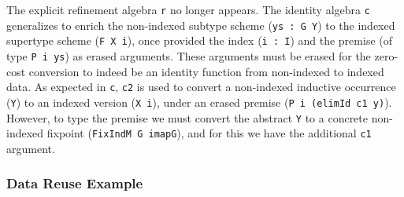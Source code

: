 \documentclass[acmsmall]{acmart}\settopmatter{}
\begin{document}
The explicit refinement algebra \verb;r; no longer appears. The
identity algebra \verb;c; generalizes to enrich the non-indexed
subtype scheme (\verb;ys : G Y;) to the indexed supertype scheme
(\verb;F X i;), once provided the index (\verb;i : I;) and the premise
(of type \verb;P i ys;) as erased arguments. These arguments must be
erased for the zero-cost conversion to indeed be an identity function
from non-indexed to indexed data. As expected in \verb;c;,
\verb;c2; is used to convert a non-indexed inductive occurrence
(\verb;Y;) to an indexed version (\verb;X i;), under an erased premise
(\verb;P i (elimId c1 y);). However, to type the premise we must
convert the abstract \verb;Y; to a concrete non-indexed
fixpoint (\verb;FixIndM G imapG;), and for this we have the
additional \verb;c1; argument.

\subsubsection{Data Reuse Example}
\end{document}
